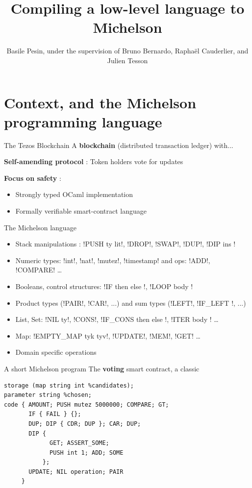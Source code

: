 \documentclass[aspectratio=169]{beamer}
\title{Compiling a low-level language to Michelson}
\author{Basile Pesin, under the supervision of Bruno Bernardo, Raphaël Cauderlier, and Julien Tesson}
\institute{Nomadic Labs}
\begin{document}
\maketitle

\section{Context, and the Michelson programming language}

\begin{frame}{The Tezos Blockchain}
  A \textbf{blockchain} (distributed transaction ledger) with...

  \textbf{Self-amending protocol} : Token holders vote for updates

  \textbf{Focus on safety} :
  \begin{itemize}
    \item Strongly typed OCaml implementation
    \item Formally verifiable smart-contract language
  \end{itemize}
\end{frame}

\begin{frame}[fragile]{The Michelson language}
  \begin{itemize}
    \item Stack manipulations : !PUSH ty lit!, !DROP!, !SWAP!, !DUP!, !DIP { ins }! 
    \item Numeric types: !int!, !nat!, !mutez!, !timestamp! and ops: !ADD!, !COMPARE! \ldots
    \item Booleans, control structures: !IF { then } { else }!, !LOOP { body }!
    \item Product types (!PAIR!, !CAR!, ...) and sum types (!LEFT!, !IF_LEFT {}!, ...)
    \item List, Set: !NIL ty!, !CONS!, !IF_CONS { then } { else }!, !ITER { body }! \ldots
    \item Map: !EMPTY_MAP tyk tyv!, !UPDATE!, !MEM!, !GET! \ldots
    \item Domain specific operations
  \end{itemize}
\end{frame}

\begin{frame}[fragile]{A short Michelson program}
The \textbf{voting} smart contract, a classic
{\footnotesize
\begin{lstlisting}[language=michelson]
storage (map string int %candidates);
parameter string %chosen;
code { AMOUNT; PUSH mutez 5000000; COMPARE; GT;
       IF { FAIL } {};
       DUP; DIP { CDR; DUP }; CAR; DUP;
       DIP {
             GET; ASSERT_SOME;
             PUSH int 1; ADD; SOME
           };
       UPDATE; NIL operation; PAIR
     }
\end{lstlisting}}
\end{frame}
\end{document}
